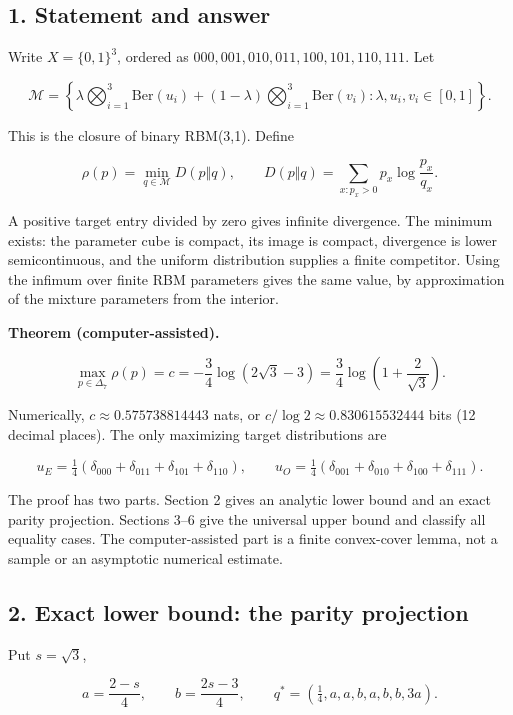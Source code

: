 \subsection{1. Statement and answer}\label{statement-and-answer}

Write \(X=\{0,1\}^3\), ordered as \(000,001,010,011,100,101,110,111\).
Let

\[
\mathcal M=\left\{\lambda\bigotimes_{i=1}^3\mathrm{Ber}(u_i)
 +(1-\lambda)\bigotimes_{i=1}^3\mathrm{Ber}(v_i):
 \lambda,u_i,v_i\in[0,1]\right\}.
\]

This is the closure of binary RBM(3,1). Define

\[
\rho(p)=\min_{q\in\mathcal M}D(p\Vert q),\qquad
D(p\Vert q)=\sum_{x:p_x>0}p_x\log\frac{p_x}{q_x}.
\]

A positive target entry divided by zero gives infinite divergence. The
minimum exists: the parameter cube is compact, its image is compact,
divergence is lower semicontinuous, and the uniform distribution
supplies a finite competitor. Using the infimum over finite RBM
parameters gives the same value, by approximation of the mixture
parameters from the interior.

\textbf{Theorem (computer-assisted).}

\[
\boxed{\max_{p\in\Delta_7}\rho(p)
=c=-\frac34\log(2\sqrt3-3)
=\frac34\log\left(1+\frac2{\sqrt3}\right).}
\]

Numerically, \(c\approx0.575738814443\) nats, or
\(c/\log2\approx0.830615532444\) bits (12 decimal places). The only
maximizing target distributions are

\[
u_E=\tfrac14(\delta_{000}+\delta_{011}+\delta_{101}+\delta_{110}),
\qquad
u_O=\tfrac14(\delta_{001}+\delta_{010}+\delta_{100}+\delta_{111}).
\]

The proof has two parts. Section 2 gives an analytic lower bound and an
exact parity projection. Sections 3--6 give the universal upper bound
and classify all equality cases. The computer-assisted part is a finite
convex-cover lemma, not a sample or an asymptotic numerical estimate.

\subsection{2. Exact lower bound: the parity
projection}\label{exact-lower-bound-the-parity-projection}

Put \(s=\sqrt3\),

\[
a=\frac{2-s}{4},\qquad b=\frac{2s-3}{4},\qquad
q^*=(\tfrac14,a,a,b,a,b,b,3a).
\]


